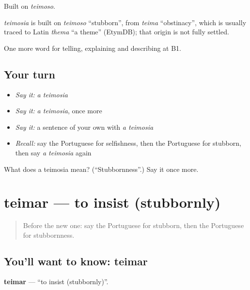 Built on \emph{teimoso}.

\begin{cousinweb}
\emph{teimosia} is built on \emph{teimoso} \textquotedblleft{}stubborn\textquotedblright{}, from \emph{teima} \textquotedblleft{}obstinacy\textquotedblright{}, which is usually traced to Latin \emph{thema} \textquotedblleft{}a theme\textquotedblright{} (EtymDB); that origin is not fully settled.
\end{cousinweb}

\begin{grammarlens}[title={What you've built}]
One more word for telling, explaining and describing at B1.
\end{grammarlens}

\subsection*{Your turn}
\begin{itemize}
\raggedright
  \item \emph{Say it:} \emph{a teimosia}
  \item \emph{Say it:} \emph{a teimosia}, once more
  \item \emph{Say it:} a sentence of your own with \emph{a teimosia}
  \item \emph{Recall:} say the Portuguese for selfishness, then the Portuguese for stubborn, then say \emph{a teimosia} again
\end{itemize}

\begin{tcolorbox}[breakable,colback=teal!4,colframe=teal!35!black,title={Before you move on}]
What does a teimosia mean? (\textquotedblleft{}Stubbornness\textquotedblright{}.) Say it once more.
\end{tcolorbox}
\section[teimar]{teimar — to insist (stubbornly)}

\label{lesson:PT-C469-teimar}



\begin{quote}
Before the new one: say the Portuguese for stubborn, then the Portuguese for stubbornness.
\end{quote}

\subsection*{You'll want to know: teimar}
\textbf{teimar} — \textquotedblleft{}to insist (stubbornly)\textquotedblright{}.

